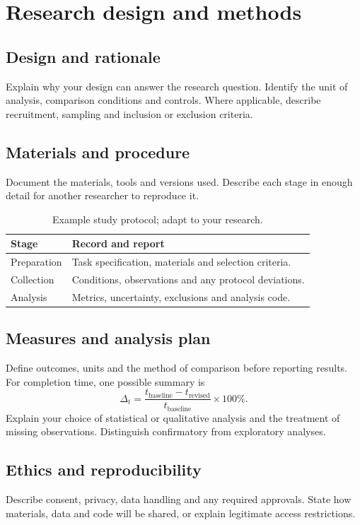 \chapter{Research design and methods}
\label{ch:methods}
\section{Design and rationale}
Explain why your design can answer the research question. Identify the unit of
analysis, comparison conditions and controls. Where applicable, describe
recruitment, sampling and inclusion or exclusion criteria.
\section{Materials and procedure}
Document the materials, tools and versions used. Describe each stage in enough
detail for another researcher to reproduce it.
\begin{table}[htbp]
\centering
\caption{Example study protocol; adapt to your research.}
\begin{tabularx}{\linewidth}{@{}lX@{}}
\toprule
\textbf{Stage} & \textbf{Record and report}\\
\midrule
Preparation & Task specification, materials and selection criteria.\\
Collection & Conditions, observations and any protocol deviations.\\
Analysis & Metrics, uncertainty, exclusions and analysis code.\\
\bottomrule
\end{tabularx}
\end{table}
\section{Measures and analysis plan}
Define outcomes, units and the method of comparison before reporting results.
For completion time, one possible summary is
\begin{equation}
\Delta_t = \frac{t_{\mathrm{baseline}}-t_{\mathrm{revised}}}{t_{\mathrm{baseline}}}\times100\%.
\end{equation}
Explain your choice of statistical or qualitative analysis and the treatment of
missing observations. Distinguish confirmatory from exploratory analyses.
\section{Ethics and reproducibility}
Describe consent, privacy, data handling and any required approvals. State how
materials, data and code will be shared, or explain legitimate access restrictions.

